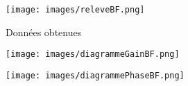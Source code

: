 \documentclass[a4paper,12pt]{article}
\begin{document}
		\begin{figure}[!h]
			\caption{Données obtenues}
			\centering
			\texttt{[image: images/releveBF.png]}
		\end{figure}

		\begin{figure}[!h]
			\caption{}
			\centering
			\texttt{[image: images/diagrammeGainBF.png]}
		\end{figure}

		\begin{figure}[!h]
			\caption{}
			\centering
			\texttt{[image: images/diagrammePhaseBF.png]}
		\end{figure}
\end{document}
